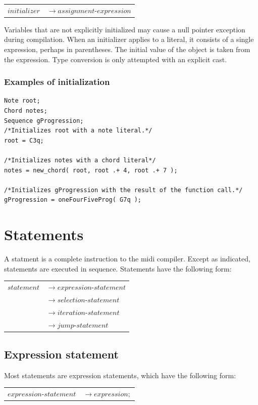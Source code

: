 \documentclass[12pt,A4]{book}
\begin{document}
\begin{tabular}{l l}
$initializer$ & $\rightarrow assignment\mbox{-}expression$\\
\end{tabular}

Variables that are not explicitly initialized may cause a null pointer exception during compilation. When an initializer applies to a literal, it consists of a single expression, perhaps in parentheses.  The initial value of the object is taken from the expression.  Type conversion is only attempted with an explicit cast.

\subsubsection{Examples of initialization}
\begin{verbatim}
Note root;
Chord notes;
Sequence gProgression;
/*Initializes root with a note literal.*/
root = C3q;

/*Initializes notes with a chord literal*/
notes = new_chord( root, root .+ 4, root .+ 7 );

/*Initializes gProgression with the result of the function call.*/
gProgression = oneFourFiveProg( G7q );
\end{verbatim}
\section{Statements}
A statment is a complete instruction to the midi compiler. Except as indicated, statements are executed in sequence.  Statements have the following form:

\begin{tabular}{l l}
$statement$ & $\rightarrow expression\mbox{-}statement$\\
& $\rightarrow selection\mbox{-}statement$\\
& $\rightarrow iteration\mbox{-}statement$\\
& $\rightarrow jump\mbox{-}statement$\\
\end{tabular}

\subsection{Expression statement}
Most statements are expression statements, which have the following form:

\begin{tabular}{l l}
$expression\mbox{-}statement$ & $\rightarrow expression;$
\end{tabular}
\end{document}
